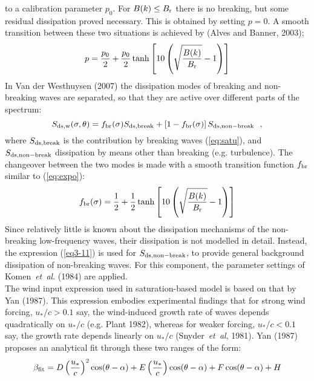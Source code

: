 \documentclass[12pt]{book}
\begin{document}
to a calibration parameter $p_0$. For $B(k) \leq B_{\rm r}$ there is no breaking, but some residual dissipation proved
necessary. This is obtained by setting $p = 0$. A smooth transition between these two situations is achieved by
(Alves and Banner, 2003);
\begin{equation}
  p = \frac{p_0}{2} + \frac{p_0}{2} \tanh \left[ 10 \left( \sqrt{\frac{B(k)}{B_{\rm r}}} - 1 \right) \right]
  \label{eq:expo}
\end{equation}
\noindent
In Van der Westhuysen (2007) the dissipation modes of breaking and non-breaking waves are separated, so that they
are active over different parts of the spectrum:
\begin{equation}
  S_{\rm ds,w}(\sigma,\theta) = f_{\rm br}(\sigma)S_{\rm ds,break} + \left[ 1 - f_{\rm br}(\sigma) \right]
  S_{\rm ds,non-break} \ \ ,
  \label{eq:wctot}
\end{equation}
\noindent
where $S_{\rm ds,break}$ is the contribution by breaking waves (\ref{eq:satu}), and $S_{\rm ds,non-break}$ dissipation
by means other than breaking (e.g. turbulence). The changeover between the two modes is made with a smooth transition
function $f_{\rm br}$ similar to (\ref{eq:expo}):
\begin{equation}
  f_{\rm br}(\sigma) = \frac{1}{2} + \frac{1}{2} \tanh \left[ 10 \left( \sqrt{\frac{B(k)}{B_{\rm r}}} - 1 \right) \right]
  \label{eq:fbr}
\end{equation}
\noindent
Since relatively little is known about the dissipation mechanisms of the non-breaking low-frequency waves, their dissipation
is not modelled in detail. Instead, the expression (\ref{eq3-11}) is used for $S_{\rm ds,non-break}$, to provide general
background dissipation of non-breaking waves. For this component, the parameter settings of Komen~{\it et~al}. (1984)
are applied.
\\[2ex]
\noindent
The wind input expression used in saturation-based model is based on that by Yan (1987). This expression embodies experimental
findings that for strong wind forcing, $u_*/c > 0.1$ say, the wind-induced growth rate of waves depends quadratically on
$u_*/c$ (e.g. Plant 1982), whereas for weaker forcing, $u_*/c < 0.1$ say, the growth rate depends linearly on $u_*/c$
(Snyder~{\it et~al}, 1981). Yan (1987) proposes an analytical fit through these two ranges of the form:
\begin{equation}
  \beta_{\rm fit} = D \left( \frac{u_*}{c} \right)^2 \cos(\theta-\alpha) + E \left( \frac{u_*}{c} \right) \cos(\theta-\alpha) +
                    F \cos(\theta-\alpha) + H
  \label{eq:yan}
\end{equation}
\end{document}

